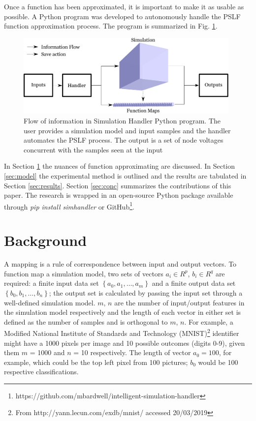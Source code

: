 \documentclass[conference]{IEEEtran}
\begin{document}
Once a function has been approximated, it is important to make it as usable as possible. A Python program was developed to autonomously handle the PSLF function approximation process. The program is summarized in Fig. \ref{fig:infoflow}.

\setcounter{figure}{2} %
\begin{figure}[h]
	\centering
	\includegraphics[width=11cm]{informationflow.pdf}
	\caption{Flow of information in Simulation Handler Python program. The user provides a simulation model and input samples and the handler automates the PSLF process. The output is a set of node voltages concurrent with the samples seen at the input	}
	\label{fig:infoflow}
\end{figure}

In Section \ref{sec:relwork} the nuances of function approximating are discussed. In Section \ref{sec:model} the experimental method is outlined and the results are tabulated in Section \ref{sec:results}. Section \ref{sec:conc} summarizes the contributions of this paper. The research is wrapped in an open-source Python package available through \textit{pip install simhandler} or GitHub\footnote{https://github.com/mbardwell/intelligent-simulation-handler}.

\section{Background}
\label{sec:relwork}
\vspace{-2em} %
A mapping is a rule of correspondence between input and output vectors. To function map a simulation model, two sets of vectors $a_{i} \in R^{p}$, $b_{i} \in R^{q}$ are required: a finite input data set $\left\{a_{0}, a_{1}, \ldots, a_{m}\right\}$ and a finite output data set $\left\{b_{0}, b_{1}, \ldots, b_{n}\right\}$; the output set is calculated by passing the input set through a well-defined simulation model. $m$, $n$ are the number of input/output features in the simulation model respectively and the length of each vector in either set is defined as the number of samples and is orthogonal to $m$, $n$. For example, a Modified National Institute of Standards and Technology (MNIST)\footnote{From http://yann.lecun.com/exdb/mnist/ accessed 20/03/2019} identifier might have a 1000 pixels per image and 10 possible outcomes (digits 0-9), given them $m$ = 1000 and $n$ = 10 respectively. The length of vector $a_0 = 100$, for example, which could be the top left pixel from 100 pictures; $b_0$ would be 100 respective classifications.
\end{document}
